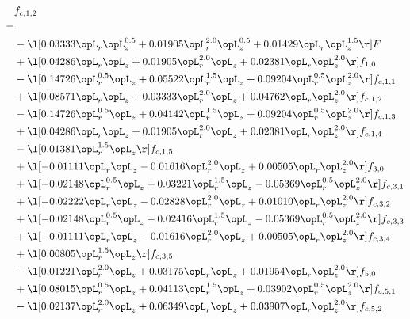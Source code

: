 \begin{alignat}{2} 
\label{eq:f_12_1} 
& f_{c,1,2} \nonumber \\ 
 = \\ 
& - \l[  0.03333 \opL_r \opL_z^{0.5} +  0.01905 \opL_r^{2.0} \opL_z^{0.5} +  0.01429 \opL_r \opL_z^{1.5}  \r] F \nonumber \\ 
& + \l[  0.04286 \opL_r \opL_z +  0.01905 \opL_r^{2.0} \opL_z +  0.02381 \opL_r \opL_z^{2.0}  \r] f_{1,0} \nonumber \\ 
& - \l[  0.14726 \opL_r^{0.5} \opL_z +  0.05522 \opL_r^{1.5} \opL_z +  0.09204 \opL_r^{0.5} \opL_z^{2.0}  \r] f_{c,1,1} \nonumber \\ 
& + \l[  0.08571 \opL_r \opL_z +  0.03333 \opL_r^{2.0} \opL_z +  0.04762 \opL_r \opL_z^{2.0}  \r] f_{c,1,2} \nonumber \\ 
& - \l[  0.14726 \opL_r^{0.5} \opL_z +  0.04142 \opL_r^{1.5} \opL_z +  0.09204 \opL_r^{0.5} \opL_z^{2.0}  \r] f_{c,1,3} \nonumber \\ 
& + \l[  0.04286 \opL_r \opL_z +  0.01905 \opL_r^{2.0} \opL_z +  0.02381 \opL_r \opL_z^{2.0}  \r] f_{c,1,4} \nonumber \\ 
& - \l[  0.01381 \opL_r^{1.5} \opL_z  \r] f_{c,1,5} \nonumber \\ 
& + \l[  -0.01111 \opL_r \opL_z   -0.01616 \opL_r^{2.0} \opL_z +  0.00505 \opL_r \opL_z^{2.0}  \r] f_{3,0} \nonumber \\ 
& + \l[  -0.02148 \opL_r^{0.5} \opL_z +  0.03221 \opL_r^{1.5} \opL_z   -0.05369 \opL_r^{0.5} \opL_z^{2.0}  \r] f_{c,3,1} \nonumber \\ 
& + \l[  -0.02222 \opL_r \opL_z   -0.02828 \opL_r^{2.0} \opL_z +  0.01010 \opL_r \opL_z^{2.0}  \r] f_{c,3,2} \nonumber \\ 
& + \l[  -0.02148 \opL_r^{0.5} \opL_z +  0.02416 \opL_r^{1.5} \opL_z   -0.05369 \opL_r^{0.5} \opL_z^{2.0}  \r] f_{c,3,3} \nonumber \\ 
& + \l[  -0.01111 \opL_r \opL_z   -0.01616 \opL_r^{2.0} \opL_z +  0.00505 \opL_r \opL_z^{2.0}  \r] f_{c,3,4} \nonumber \\ 
& + \l[  0.00805 \opL_r^{1.5} \opL_z  \r] f_{c,3,5} \nonumber \\ 
& - \l[  0.01221 \opL_r^{2.0} \opL_z +  0.03175 \opL_r \opL_z +  0.01954 \opL_r \opL_z^{2.0}  \r] f_{5,0} \nonumber \\ 
& + \l[  0.08015 \opL_r^{0.5} \opL_z +  0.04113 \opL_r^{1.5} \opL_z +  0.03902 \opL_r^{0.5} \opL_z^{2.0}  \r] f_{c,5,1} \nonumber \\ 
& - \l[  0.02137 \opL_r^{2.0} \opL_z +  0.06349 \opL_r \opL_z +  0.03907 \opL_r \opL_z^{2.0}  \r] f_{c,5,2} \nonumber \\ 

\end{alignat}
